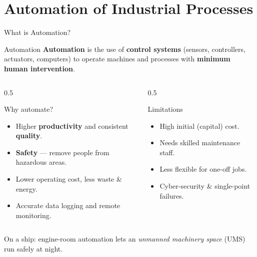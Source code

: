 \documentclass[aspectratio=169]{beamer}
\begin{document}
	\section{Automation of Industrial Processes}
	\begin{frame}{What is Automation?}
		\begin{block}{Automation}
			\textbf{Automation} is the use of \textbf{control systems} (sensors, controllers,
			actuators, computers) to operate machines and processes with \textbf{minimum human intervention}.
		\end{block}
		\vspace{0.2cm}
		\begin{columns}[T]
			\begin{column}{0.5\textwidth}
				\begin{block}{Why automate?}
					\begin{itemize}\small
						\item Higher \textbf{productivity} and consistent \textbf{quality}.
						\item \textbf{Safety} --- remove people from hazardous areas.
						\item Lower operating cost, less waste \& energy.
						\item Accurate data logging and remote monitoring.
					\end{itemize}
				\end{block}
			\end{column}
			\begin{column}{0.5\textwidth}
				\begin{block}{Limitations}
					\begin{itemize}\small
						\item High initial (capital) cost.
						\item Needs skilled maintenance staff.
						\item Less flexible for one-off jobs.
						\item Cyber-security \& single-point failures.
					\end{itemize}
				\end{block}
			\end{column}
		\end{columns}
		\vspace{0.2cm}
		\footnotesize\centering
		On a ship: engine-room automation lets an \emph{unmanned machinery space} (UMS) run safely at night.
	\end{frame}
\end{document}
